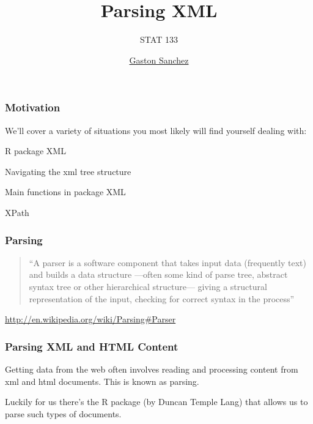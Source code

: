 \documentclass[12pt]{beamer}\usepackage[]{graphicx}\usepackage[]{color}
\title{Parsing XML}
\subtitle{STAT 133}
\author{\href{http://www.gastonsanchez.com}{Gaston Sanchez}}
\institute{\href{https://github.com/ucb-stat133/stat133-fall-2016}{\tt \scriptsize \color{foreground} github.com/ucb-stat133/stat133-fall-2016}}
\date{}
\begin{document}
{
  \frame{
    \titlepage
  } 
}


\begin{frame}
\begin{center}
\Huge{}
\end{center}
\end{frame}


\begin{frame}
\frametitle{Motivation}

We'll cover a variety of situations you most likely will find yourself dealing with:
\bi
 \item R package XML
 \item Navigating the xml tree structure
 \item Main functions in package XML
 \item XPath
\ei
\eb

\end{frame}


\begin{frame}
\frametitle{Parsing}

\begin{quotation}
``A parser is a software component that takes input data (frequently text) and builds a data structure ---often some kind of parse tree, abstract syntax tree or other hierarchical structure--- giving a structural representation of the input, checking for correct syntax in the process''
\end{quotation}

{\footnotesize 
\url{http://en.wikipedia.org/wiki/Parsing\#Parser} \\
}

\end{frame}


\begin{frame}
\frametitle{Parsing XML and HTML Content}

Getting data from the web often involves reading and processing content from xml and html documents. This is known as parsing. 

\bigskip
Luckily for us there's the R package  (by Duncan Temple Lang) that allows us to parse such types of documents.
\eb

\end{frame}
\end{document}
